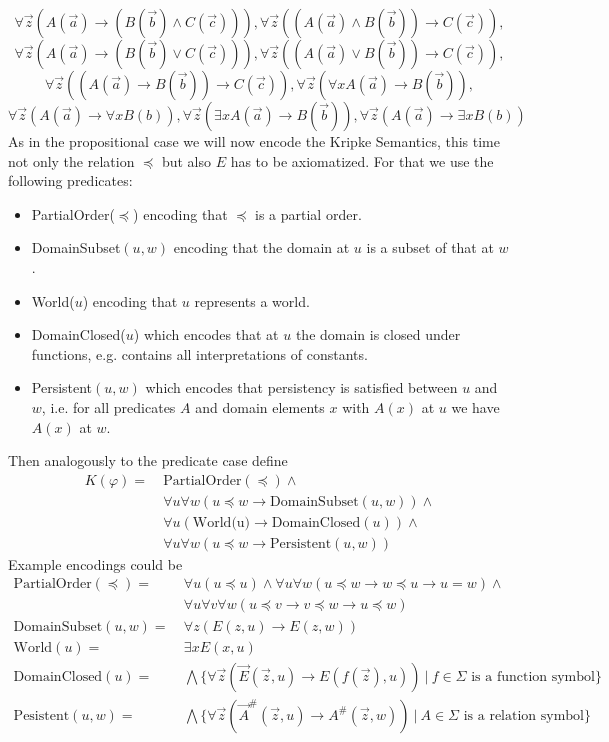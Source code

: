 \documentclass[a4paper,12pt]{report}
\theoremstyle{definition}
\theoremstyle{definition}
\theoremstyle{definition}
\theoremstyle{definition}
\theoremstyle{definition}
\theoremstyle{definition}
\theoremstyle{definition}
\begin{document}
	$$\forall \vec z(A(\vec a)\to (B(\vec b)\wedge C(\vec c))), \forall \vec z((A(\vec a)\wedge B(\vec b))\to C(\vec c)),$$$$ \forall \vec z(A(\vec a)\to (B(\vec b)\vee C(\vec c))),
	\forall \vec z((A(\vec a)\vee B(\vec b))\to C(\vec c)),$$$$ \forall \vec z((A(\vec a)\to B(\vec b))\to C(\vec c)),\forall \vec z(\forall xA(\vec a)\to B(\vec b)),$$$$ \forall \vec z(A(\vec a)\to\forall xB(b)), \forall \vec z(\exists xA(\vec a)\to B(\vec b)), \forall \vec z(A(\vec a)\to\exists xB(b))$$	
	As in the propositional case we will now encode the Kripke Semantics, this time not only the relation $\preceq$ but also $E$ has to be axiomatized. For that we use the following predicates:
	\begin{itemize}
		\item PartialOrder($\preceq$) encoding that $\preceq$ is a partial order.
		\item DomainSubset$(u, w)$ encoding that the domain at $u$ is a subset of that at $w$.
		\item World($u$) encoding that $u$ represents a world.
		\item DomainClosed($u$) which encodes that at $u$ the domain is closed under functions, e.g. contains all interpretations of constants.
		\item Persistent$(u, w)$ which encodes that persistency is satisfied between $u$ and $w$, i.e. for all predicates $A$ and domain elements $x$ with $A(x)$ at $u$ we have $A(x)$ at $w$.
	\end{itemize}
	Then analogously to the predicate case define
	\begin{align*}
		K(\varphi) = \:& \text{PartialOrder}(\preceq) \wedge \\
		& \forall u \forall w (u\preceq w\to \text{DomainSubset}(u, w)) \wedge\\
		& \forall u(\text{World(u)}\to \text{DomainClosed}(u))\wedge\\
		& \forall u\forall w (u\preceq w\to \text{Persistent}(u, w))
	\end{align*}
	Example encodings could be
	\begin{align*}
		\text{PartialOrder}(\preceq) = &\:\forall u(u\preceq u)\wedge\forall u\forall w(u\preceq w\to w\preceq u\to u = w)\wedge\\&\:\forall u\forall v\forall w(u\preceq v\to v\preceq w\to u\preceq w)\\
		\text{DomainSubset}(u, w) = &\:\forall z(E(z, u)\to E(z, w))\\
		\text{World}(u) = &\:\exists xE(x, u)\\
		\text{DomainClosed}(u) = &\:\bigwedge\{\forall\vec z(\vec E(\vec z, u)\to E(f(\vec z), u))\:|\:\text{$f\in\Sigma$ is a function symbol}\}\\
		\text{Pesistent}(u, w) = &\:\bigwedge\{\forall\vec z(\vec A^\#(\vec z, u)\to A^\#(\vec z, w))\:|\:\text{$A\in\Sigma$ is a relation symbol}\}
	\end{align*}
	
\end{document}
